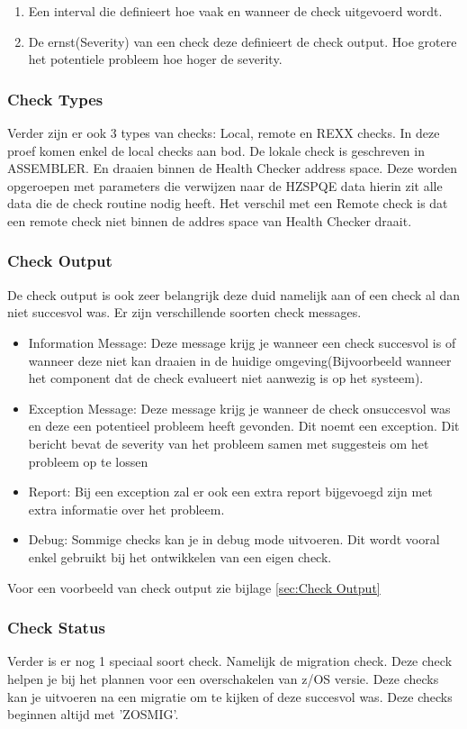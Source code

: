 \begin{enumerate}
	\item Een interval die definieert hoe vaak en wanneer de check uitgevoerd wordt.
	\item De ernst(Severity) van een check deze definieert de check output. Hoe grotere het potentiele probleem hoe hoger de severity. 
\end{enumerate}

\subsubsection{Check Types}
\label{subsubsec:Check Type}

Verder zijn er ook 3 types van checks: Local, remote en REXX checks. In deze proef komen enkel de local checks aan bod. De lokale check is geschreven in ASSEMBLER. En draaien binnen de Health Checker address space. Deze worden opgeroepen met parameters die verwijzen naar de HZSPQE data hierin zit alle data die de check routine nodig heeft. Het verschil met een Remote check is dat een remote check niet binnen de addres space van Health Checker draait. 

\subsubsection{Check Output}
\label{subsubsec:Check Output}

De check output is ook zeer belangrijk deze duid namelijk aan of een check al dan niet succesvol was. Er zijn verschillende soorten check messages.

\begin{itemize}
	\item Information Message: Deze message krijg je wanneer een check succesvol is of wanneer deze niet kan draaien in de huidige omgeving(Bijvoorbeeld wanneer het component dat de check evalueert niet aanwezig is op het systeem).
	\item Exception Message: Deze message krijg je wanneer de check onsuccesvol was en deze een potentieel probleem heeft gevonden. Dit noemt een exception. Dit bericht bevat de severity van het probleem samen met suggesteis om het probleem op te lossen
	\item Report: Bij een exception zal er ook een extra report bijgevoegd zijn met extra informatie over het probleem.
	\item Debug: Sommige checks kan je in debug mode uitvoeren. Dit wordt vooral enkel gebruikt bij het ontwikkelen van een eigen check.	
\end{itemize}

Voor een voorbeeld van check output zie bijlage \ref{sec:Check Output}

\subsubsection{Check Status}
\label{subsubsec:Check Status}

Verder is er nog 1 speciaal soort check. Namelijk de migration check. Deze check helpen je bij het plannen voor een overschakelen van z/OS versie. Deze checks kan je uitvoeren na een migratie om te kijken of deze succesvol was. Deze checks beginnen altijd met 'ZOSMIG'.
